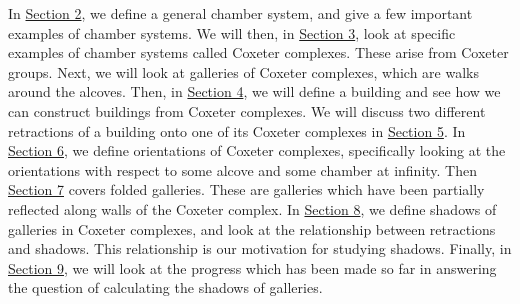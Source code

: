 \documentclass[11pt]{article}
\begin{document}






In \hyperref[2]{Section 2}, we define a general chamber system, and give a few important examples of chamber systems. We will then, in \hyperref[3]{Section 3}, look at specific examples of chamber systems called Coxeter complexes. These arise from Coxeter groups. Next, we will look at galleries of Coxeter complexes, which are walks around the alcoves. Then, in \hyperref[4]{Section 4}, we will define a building and see how we can construct buildings from Coxeter complexes. We will discuss two different retractions of a building onto one of its Coxeter complexes in \hyperref[5]{Section 5}. In \hyperref[6]{Section 6}, we define orientations of Coxeter complexes, specifically looking at the orientations with respect to some alcove and some chamber at infinity. Then \hyperref[7]{Section 7} covers folded galleries. These are galleries which have been partially reflected along walls of the Coxeter complex. In \hyperref[8]{Section 8}, we define shadows of galleries in Coxeter complexes, and look at the relationship between retractions and shadows. This relationship is our motivation for studying shadows. Finally, in \hyperref[9]{Section 9}, we will look at the progress which has been made so far in answering the question of calculating the shadows of galleries. 
\end{document}
